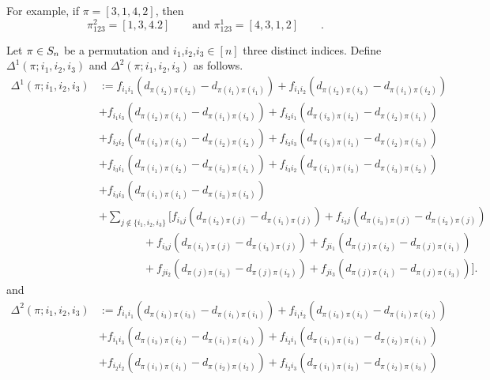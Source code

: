 For example, if $\pi = [3,1,4,2]$, then
\[
\pi^2_{123}=[1,3,4.2]\qquad \text{and }
\pi^1_{123}=[4,3,1,2]\qquad .
\]
\begin{defi}
Let $\pi \in S_n$ be a permutation and $i_1$,$i_2$,$i_3 \in [n]$ three distinct indices. 
Define $\varDelta^1(\pi;i_1,i_2,i_3)$ and $\varDelta^2(\pi;i_1,i_2,i_3)$ as follows.
\footnotesize
\begin{equation}
\label{eq:Delta1}
\begin{split}
\Delta^1(\pi;i_1,i_2,i_3)&:=
f_{i_1i_1}\left(d_{\pi(i_2)\pi(i_2)}-d_{\pi(i_1)\pi(i_1)}\right)
+f_{i_1i_2}\left(d_{\pi(i_2)\pi(i_3)}-d_{\pi(i_1)\pi(i_2)}\right)\\
&+f_{i_1i_3}\left(d_{\pi(i_2)\pi(i_1)}-d_{\pi(i_1)\pi(i_3)}\right)
+f_{i_2i_1}\left(d_{\pi(i_3)\pi(i_2)}-d_{\pi(i_2)\pi(i_1)}\right) \\
&+f_{i_2i_2}\left(d_{\pi(i_3)\pi(i_3)}-d_{\pi(i_2)\pi(i_2)}\right)
+f_{i_2i_3}\left(d_{\pi(i_3)\pi(i_1)}-d_{\pi(i_2)\pi(i_3)}\right) \\
&+f_{i_3i_1}\left(d_{\pi(i_1)\pi(i_2)}-d_{\pi(i_3)\pi(i_1)}\right)
+f_{i_3i_2}\left(d_{\pi(i_1)\pi(i_3)}-d_{\pi(i_3)\pi(i_2)}\right) \\
&+f_{i_3i_3}\left(d_{\pi(i_1)\pi(i_1)}-d_{\pi(i_3)\pi(i_3)}\right)\\
&+\sum_{j\notin\{i_1,i_2,i_3\}}\Big[
f_{i_1j}\left(d_{\pi(i_2)\pi(j)}-d_{\pi(i_1)\pi(j)}\right)
+f_{i_2j}\left(d_{\pi(i_3)\pi(j)}-d_{\pi(i_2)\pi(j)}\right)\\
&\qquad \qquad
+f_{i_3j}\left(d_{\pi(i_1)\pi(j)}-d_{\pi(i_3)\pi(j)}\right)
+f_{ji_1}\left(d_{\pi(j)\pi(i_2)}-d_{\pi(j)\pi(i_1)}\right) \\
&\qquad \qquad
+f_{ji_2}\left(d_{\pi(j)\pi(i_3)}-d_{\pi(j)\pi(i_2)}\right)
+f_{ji_3}\left(d_{\pi(j)\pi(i_1)}-d_{\pi(j)\pi(i_3)}\right) \Big].
\end{split}
\end{equation}	
\normalsize
and
\footnotesize
\begin{equation}
\label{eq:Delta2}
\begin{split}
\Delta^2(\pi;i_1,i_2,i_3)&:=
f_{i_1i_1}\left(d_{\pi(i_3)\pi(i_3)}-d_{\pi(i_1)\pi(i_1)}\right)
+f_{i_1i_2}\left(d_{\pi(i_3)\pi(i_1)}-d_{\pi(i_1)\pi(i_2)}\right)\\
&+f_{i_1i_3}\left(d_{\pi(i_3)\pi(i_2)}-d_{\pi(i_1)\pi(i_3)}\right)
+f_{i_2i_1}\left(d_{\pi(i_1)\pi(i_3)}-d_{\pi(i_2)\pi(i_1)}\right) \\
&+f_{i_2i_2}\left(d_{\pi(i_1)\pi(i_1)}-d_{\pi(i_2)\pi(i_2)}\right)
+f_{i_2i_3}\left(d_{\pi(i_1)\pi(i_2)}-d_{\pi(i_2)\pi(i_3)}\right) \\

\end{split}
\end{equation}
\end{defi}
